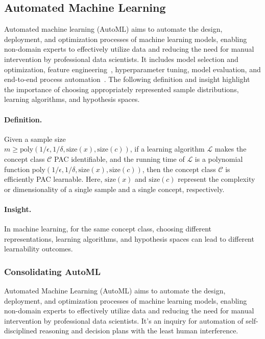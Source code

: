  \subsection{Automated Machine Learning}\label{sec:auto_ml}
  
  Automated machine learning (AutoML) aims to automate the design, deployment, and optimization processes of machine learning models, enabling non-domain experts to effectively utilize data and reducing the need for manual intervention by professional data scientists. It includes model selection and optimization, feature engineering~\cite{Hollmann2023LargeLM}, hyperparameter tuning, model evaluation, and end-to-end process automation~\cite{salehin2024automl}. The following definition and insight highlight the importance of choosing appropriately represented sample distributions, learning algorithms, and hypothesis spaces.
  
  \paragraph{Definition.} Given a sample size \\ $m \geq \text{poly}(1/\epsilon, 1/ \delta, \text{size}(x), \text{size}(c))$, if a learning algorithm $\mathcal{L}$ makes the concept class $\mathcal{C}$ PAC identifiable, and the running time of $\mathcal{L}$ is a polynomial function $\text{poly}(1/\epsilon, 1/ \delta, \text{size}(x), \text{size}(c))$, then the concept class $\mathcal{C}$ is efficiently PAC learnable. Here, $\text{size}(x)$ and $\text{size}(c)$ represent the complexity or dimensionality of a single sample and a single concept, respectively.
  
  \paragraph{Insight.} In machine learning, for the same concept class, choosing different representations, learning algorithms, and hypothesis spaces can lead to different learnability outcomes.
  
  
  
  \subsubsection{Consolidating AutoML}\label{sec:consolidate_automl}
  
  Automated Machine Learning (AutoML) aims to automate the design, deployment, and optimization processes of machine learning models, enabling non-domain experts to effectively utilize data and reducing the need for manual intervention by professional data scientists. It's an inquiry for automation of self-disciplined reasoning and decision plans with the least human interference.
  
